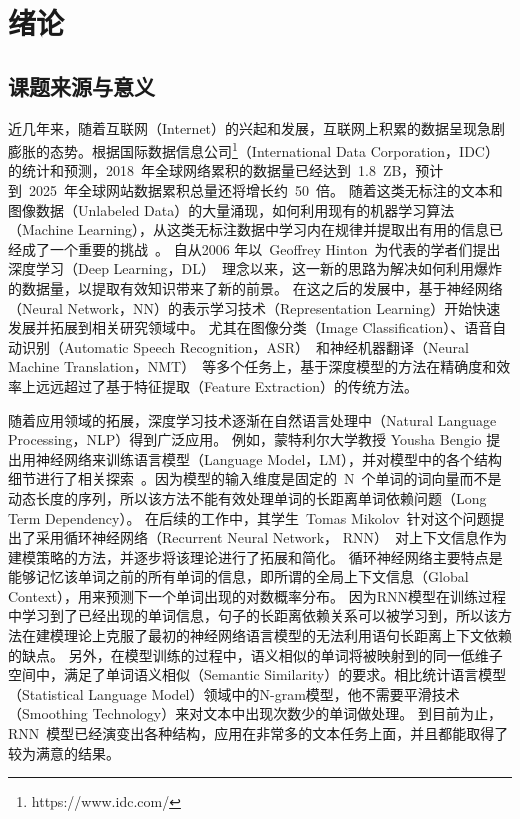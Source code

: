 \chapter{绪论}
\section{课题来源与意义}
近几年来，随着互联网（Internet）的兴起和发展，互联网上积累的数据呈现急剧膨胀的态势。根据国际数据信息公司\footnote{https://www.idc.com/}（International Data Corporation，IDC）的统计和预测，2018~年全球网络累积的数据量已经达到~1.8~ZB，预计到~2025~年全球网站数据累积总量还将增长约~50~倍。
随着这类无标注的文本和图像数据（Unlabeled Data）的大量涌现，如何利用现有的机器学习算法（Machine Learning），从这类无标注数据中学习内在规律并提取出有用的信息已经成了一个重要的挑战~。
自从2006 年以~Geoffrey Hinton~为代表的学者们提出深度学习（Deep Learning，DL）~理念以来，这一新的思路为解决如何利用爆炸的数据量，以提取有效知识带来了新的前景。
在这之后的发展中，基于神经网络（Neural Network，NN）的表示学习技术（Representation Learning）开始快速发展并拓展到相关研究领域中。
尤其在图像分类（Image Classification）、语音自动识别（Automatic Speech Recognition，ASR）~和神经机器翻译（Neural Machine Translation，NMT）~等多个任务上，基于深度模型的方法在精确度和效率上远远超过了基于特征提取（Feature Extraction）的传统方法。

随着应用领域的拓展，深度学习技术逐渐在自然语言处理中（Natural Language Processing，NLP）得到广泛应用。 例如，蒙特利尔大学教授 Yousha Bengio 提出用神经网络来训练语言模型（Language Model，LM），并对模型中的各个结构细节进行了相关探索~。因为模型的输入维度是固定的~N~个单词的词向量而不是动态长度的序列，所以该方法不能有效处理单词的长距离单词依赖问题（Long Term Dependency）。
在后续的工作中，其学生~Tomas Mikolov~针对这个问题提出了采用循环神经网络（Recurrent Neural Network， RNN）~对上下文信息作为建模策略的方法，并逐步将该理论进行了拓展和简化。
循环神经网络主要特点是能够记忆该单词之前的所有单词的信息，即所谓的全局上下文信息（Global Context），用来预测下一个单词出现的对数概率分布。
因为RNN模型在训练过程中学习到了已经出现的单词信息，句子的长距离依赖关系可以被学习到，所以该方法在建模理论上克服了最初的神经网络语言模型的无法利用语句长距离上下文依赖的缺点。
另外，在模型训练的过程中，语义相似的单词将被映射到的同一低维子空间中，满足了单词语义相似（Semantic Similarity）的要求。相比统计语言模型（Statistical Language Model）领域中的N-gram模型，他不需要平滑技术（Smoothing Technology）来对文本中出现次数少的单词做处理。
到目前为止，RNN~模型已经演变出各种结构，应用在非常多的文本任务上面，并且都能取得了较为满意的结果。

